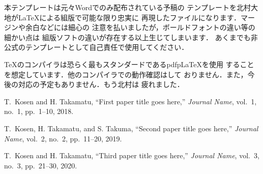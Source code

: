 \documentclass[a4j,10pt]{jsarticle}
\begin{document}
本テンプレートは元々Wordでのみ配布されている予稿の
テンプレートを北村大地がLaTeXによる組版で可能な限り忠実に
再現したファイルになります．マージンや余白などには細心の
注意を払いましたが，ボールドフォントの違い等の細かい点は
組版ソフトの違いが存在する以上生じてしまいます．
あくまでも非公式のテンプレートとして自己責任で使用してください．

TeXのコンパイラは恐らく最もスタンダードであるpdfpLaTeXを使用
することを想定しています．他のコンパイラでの動作確認はして
おりません．また，今後の対応の予定もありません．もう北村は
疲れました．


\begin{thebibliography}{9}%

  T.~Kosen and H. Takamatu,
  ``First paper title goes here,''
  {\it Journal Name}, vol.~1, no.~1, pp.~1--10, 2018.

  T.~Kosen, H. Takamatu, and S. Takuma, 
  ``Second paper title goes here,''
  {\it Journal Name}, vol.~2, no.~2, pp.~11--20, 2019.

  T.~Kosen and H. Takamatu,
  ``Third paper title goes here,''
  {\it Journal Name}, vol.~3, no.~3, pp.~21--30, 2020.

\end{thebibliography}
\end{document}
